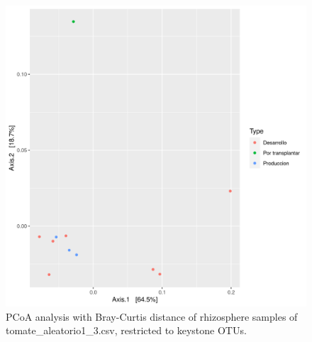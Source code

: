 \begin{figure}
  \centering
  \includegraphics[scale = 0.7]{pcoa_key_otus_tomate_aleatorio1_3.csv.png}
  \caption{PCoA analysis with Bray-Curtis distance of rhizosphere samples of tomate_aleatorio1_3.csv, restricted to keystone OTUs.}
  \label{fig:tomate_aleatorio1_3.csv_pcoa_key_otus}
\end{figure}
